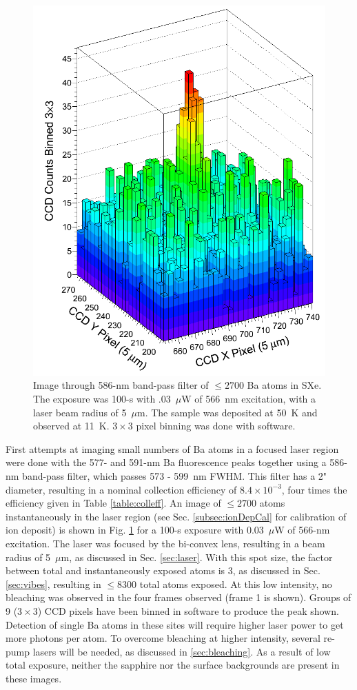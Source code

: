 \begin{figure} %
        \centering
                \includegraphics[width=.6\textwidth]{figures/image_1e4.png}
                \caption{Image through 586-nm band-pass filter of $\leq 2700$ Ba atoms in SXe.  The exposure was 100-s with .03~$\mu$W of 566~nm excitation, with a laser beam radius of 5~$\mu$m.  The sample was deposited at 50~K and observed at 11~K.  $3 \times 3$ pixel binning was done with software.}
\label{fig:image590s}
\end{figure}

First attempts at imaging small numbers of Ba atoms in a focused laser region were done with the 577- and 591-nm Ba fluorescence peaks together using a 586-nm band-pass filter, which passes 573 - 599~nm FWHM.  This filter has a 2" diameter, resulting in a nominal collection efficiency of $8.4 \times 10^{-3}$, four times the efficiency given in Table \ref{table:colleff}.  An image of $\leq 2700$ atoms instantaneously in the laser region (see Sec. \ref{subsec:ionDepCal} for calibration of ion deposit) is shown in Fig. \ref{fig:image590s} for a 100-s exposure with 0.03~$\mu$W of 566-nm excitation.  The laser was focused by the bi-convex lens, resulting in a beam radius of 5~$\mu$m, as discussed in Sec. \ref{sec:laser}.  With this spot size, the factor between total and instantaneously exposed atoms is 3, as discussed in Sec. \ref{sec:vibes}, resulting in $\leq 8300$ total atoms exposed.  At this low intensity, no bleaching was observed in the four frames observed (frame 1 is shown).  Groups of 9 ($3 \times 3$) CCD pixels have been binned in software to produce the peak shown.  Detection of single Ba atoms in these sites will require higher laser power to get more photons per atom.  To overcome bleaching at higher intensity, several re-pump lasers will be needed, as discussed in \ref{sec:bleaching}.  As a result of low total exposure, neither the sapphire nor the surface backgrounds are present in these images. 

